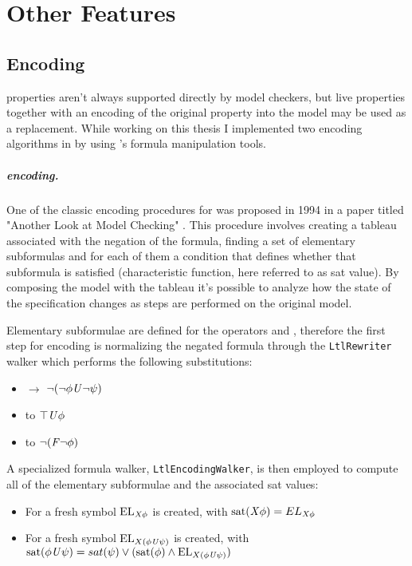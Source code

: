 \chapter{Other Features}

\section{\ltl{} Encoding}
\ltl{} properties aren't always supported directly by model checkers, but live properties together with an encoding of the original property into the model may be used as a replacement.
While working on this thesis I implemented two \ltl{} encoding algorithms in \pyvmt{} by using \pysmt{}'s formula manipulation tools.

\paragraph*{\ltltosmv{} encoding.}
One of the classic encoding procedures for \ltl{} was proposed in 1994 in a paper titled "Another Look at \ltl{} Model Checking" \cite{Clarke1997}.
This procedure involves creating a tableau associated with the negation of the \ltl{} formula, finding a set of elementary subformulas and for each of them a condition that defines whether that subformula is satisfied (characteristic function, here referred to as sat value).
By composing the model with the tableau it's possible to analyze how the state of the \ltl{} specification changes as steps are performed on the original model.

Elementary subformulae are defined for the \ltl{} operators \fX{} and \fU{}, therefore the first step for encoding is normalizing the negated formula through the \texttt{LtlRewriter} walker which performs the following substitutions:
\begin{itemize}
    \item \fR{} $\longrightarrow{}$ $\lnot(\lnot \phi \mathit{U} \lnot \psi)$
    \item \fF{} to $\top \mathit{U} \phi$
    \item \fG{} to $\lnot (\mathit{F} \lnot \phi)$
\end{itemize}

A specialized formula walker, \texttt{LtlEncodingWalker}, is then employed to compute all of the elementary subformulae and the associated sat values:
\begin{itemize}
    \item For \fX{} a fresh symbol $\mathrm{EL}_{\mathit{X}{} \phi}$ is created, with $\mathrm{sat}(\mathit{X}{} \phi) = EL_{\mathit{X}{} \phi}$
    \item For \fU{} a fresh symbol $\mathrm{EL}_{X (\phi \mathit{U}{} \psi)}$ is created, with $\mathrm{sat}(\phi \mathit{U}{} \psi) = sat(\psi) \lor (\mathrm{sat}(\phi) \land \mathrm{EL}_{X (\phi \mathit{U}{} \psi)})$
\end{itemize}

